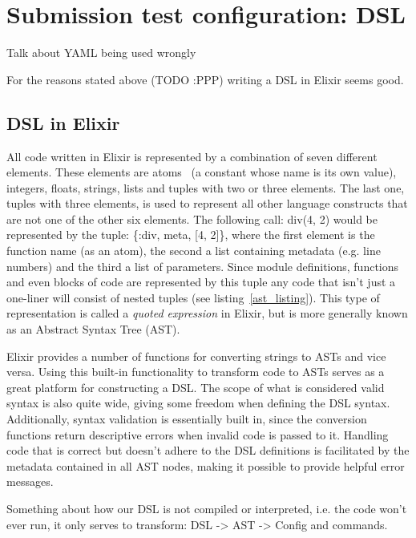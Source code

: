 
\section{Submission test configuration: DSL}

Talk about YAML being used wrongly

For the reasons stated above (TODO :PPP) writing a DSL in Elixir seems good.

\label{dsl_elixir}
\subsection{DSL in Elixir}
All code written in Elixir is represented by a combination of seven different elements. These elements are atoms~\cite{BasicElixir} (a constant whose name is its own value), integers, floats, strings, lists and tuples with two or three elements. The last one, tuples with three elements, is used to represent all other language constructs that are not one of the other six elements. The following call: div(4, 2) would be represented by the tuple: \{:div, meta, [4, 2]\}, where the first element is the function name (as an atom), the second a list containing metadata (e.g. line numbers) and the third a list of parameters. Since module definitions, functions and even blocks of code are represented by this tuple any code that isn't just a one-liner will consist of nested tuples (see listing~\ref{ast_listing}). This type of representation is called a \textit{quoted expression} in Elixir, but is more generally known as an Abstract Syntax Tree (AST).

Elixir provides a number of functions for converting strings to ASTs and vice versa. Using this built-in functionality to transform code to ASTs serves as a great platform for constructing a DSL. The scope of what is considered valid syntax is also quite wide, giving some freedom when defining the DSL syntax. Additionally, syntax validation is essentially built in, since the conversion functions return descriptive errors when invalid code is passed to it. Handling code that is correct but doesn't adhere to the DSL definitions is facilitated by the metadata contained in all AST nodes, making it possible to provide helpful error messages.  

Something about how our DSL is not compiled or interpreted, i.e. the code won't ever run, it only serves to transform: DSL -> AST -> Config and commands.

